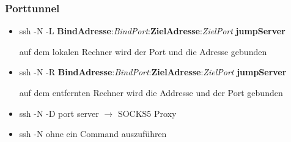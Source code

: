 \begin{frame}
\frametitle{Porttunnel}
\begin{itemize}
\item ssh -N -L \textbf{BindAdresse}:\textit{BindPort}:\textbf{ZielAdresse}:\textit{ZielPort} \textbf{jumpServer} 

auf dem lokalen Rechner wird der Port und die Adresse gebunden
\pause
\item ssh -N -R \textbf{BindAdresse}:\textit{BindPort}:\textbf{ZielAdresse}:\textit{ZielPort} \textbf{jumpServer}

 auf dem entfernten Rechner wird die Addresse und der Port gebunden
\pause
\item ssh -N -D port server 	$\rightarrow$ SOCKS5 Proxy
\pause
\item ssh -N ohne ein Command auszuführen
\end{itemize}
\end{frame}
